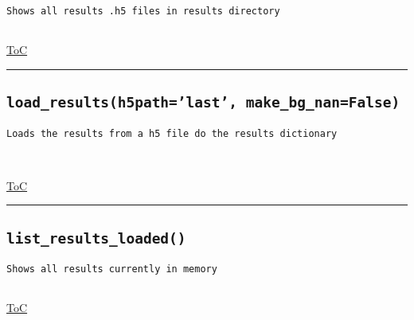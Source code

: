 \documentclass{article}
\begin{document}
\begin{lstlisting}[language=docstring]
Shows all results .h5 files in results directory
    
\end{lstlisting}

\begin{flushright}

\hyperref[toc]{ToC}

\end{flushright}



\vspace{5mm}

\hrule

\subsection*{\texttt{load\_results(h5path='last', make\_bg\_nan=False)}}

\begin{lstlisting}[language=docstring]
Loads the results from a h5 file do the results dictionary

    
\end{lstlisting}

\begin{flushright}

\hyperref[toc]{ToC}

\end{flushright}



\vspace{5mm}

\hrule

\subsection*{\texttt{list\_results\_loaded()}}

\begin{lstlisting}[language=docstring]
Shows all results currently in memory
    
\end{lstlisting}

\begin{flushright}

\hyperref[toc]{ToC}

\end{flushright}
\end{document}
